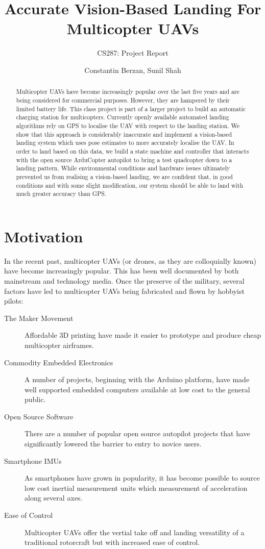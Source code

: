 \documentclass[10pt]{scrartcl} %
\title{Accurate Vision-Based Landing For Multicopter UAVs}
\subtitle{CS287: Project Report}
\author{Constantin Berzan, Sunil Shah}
\date{}
\begin{document}
\maketitle

\begin{abstract}
Multicopter UAVs have become increasingly popular over the last five years and are being considered for commercial purposes. However, they are hampered by their limited battery life. This class project is part of a larger project to build an automatic charging station for multicopters. Currently openly available automated landing algorithms rely on GPS to localise the UAV with respect to the landing station. We show that this approach is considerably inaccurate and implement a vision-based landing system which uses pose estimates to more accurately localise the UAV. 
In order to land based on this data, we build a state machine and controller that interacts with the open source ArduCopter autopilot to bring a test quadcopter down to a landing pattern. While environmental conditions and hardware issues ultimately prevented us from realising a vision-based landing, we are confident that, in good conditions and with some slight modification, our system should be able to land with much greater accuracy than GPS.
\end{abstract}
\section{Motivation}
In the recent past, multicopter UAVs (or drones, as they are colloquially known) have become increasingly popular. This has been well documented by both mainstream and technology media. Once the preserve of the military, several factors have led to multicopter UAVs being fabricated and flown by hobbyist pilots:
\begin{description}
\item[The Maker Movement]{Affordable 3D printing have made it easier to prototype and produce cheap multicopter airframes.}
\item[Commodity Embedded Electronics]{A number of projects, beginning with the Arduino platform, have made well supported embedded computers available at low cost to the general public.}
\item[Open Source Software]{There are a number of popular open source autopilot projects that have significantly lowered the barrier to entry to novice users.}
\item[Smartphone IMUs]{As smartphones have grown in popularity, it has become possible to source low cost inertial measurement units which measurement of acceleration along several axes.}
\item[Ease of Control]{Multicopter UAVs offer the vertial take off and landing versatility of a traditional rotorcraft but with increased ease of control.}
\end{description}
\end{document}
